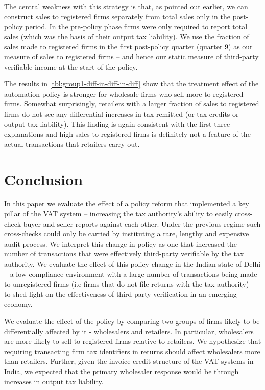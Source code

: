 \begin{table}[h]
{\begin{threeparttable}
\begin{tablenotes}
\end{tablenotes}
\label{tbl:group1-diff-in-diff-in-diff}
\end{threeparttable}}
\end{table}

The central weakness with this strategy is that, as pointed out earlier, we can construct sales to registered firms separately from
total sales only in the post-policy period. In the pre-policy phase firms were only required to report total sales (which was the basis of their output tax liability). We use the fraction of sales made to registered firms in the first post-policy quarter (quarter 9) as our measure of sales to registered firms -- and hence our static measure of third-party verifiable income at the start of the policy. 

The results in \cref{tbl:group1-diff-in-diff-in-diff} show that the treatment effect of the automation policy is stronger for wholesale firms who sell more to registered firms. Somewhat surprisingly, retailers with a larger fraction of sales to registered firms do not see any differential increases in tax remitted (or tax credits or output tax liability). This finding is again consistent with the first three explanations and high sales to registered firms is definitely not a feature of the actual transactions that retailers carry out.

\section{Conclusion} 
\label{sec:1-conclusion} 
In this paper we evaluate the effect of a policy reform that implemented a key pillar of the VAT system -- increasing the tax authority's ability to easily cross-check buyer and seller reports against each other. Under the previous regime such cross-checks could only be carried by instituting a rare, lengthy and expensive audit process. We interpret this change in policy as one that increased the number of transactions that were effectively third-party verifiable by the tax authority. We evaluate the effect of this policy change in the Indian state of Delhi -- a low compliance environment with a large number of
transactions being made to unregistered firms (i.e firms that do not file returns with the tax authority) -- to shed light on the effectiveness of third-party verification in an emerging economy.

We evaluate the effect of the policy by comparing two groups of firms likely to be differentially affected by it - wholesalers and retailers. In particular, wholesalers are more likely to sell to registered firms relative to retailers. We hypothesize that requiring transacting firm tax identifiers in returns should affect wholesalers more than retailers.  Further, given the invoice-credit structure of the VAT systems in India, we expected that the primary wholesaler response would be through increases in output tax liability.

